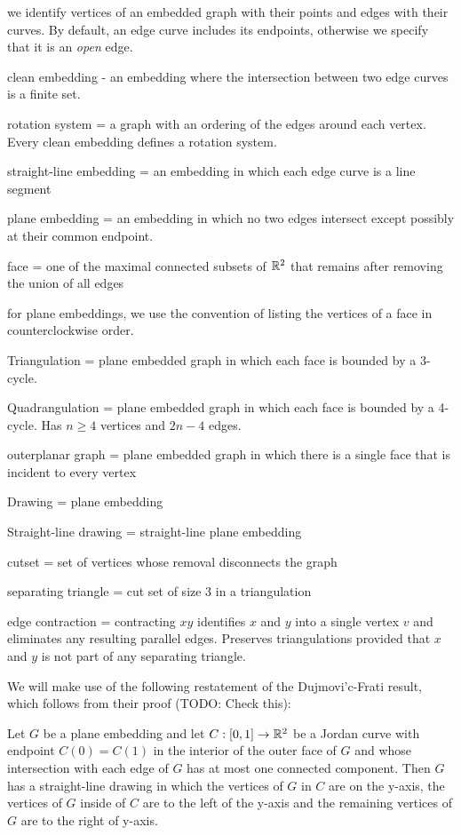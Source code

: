 \documentclass{patmorin}
\begin{document}
we identify vertices of an embedded graph with their points and edges with their curves. By default, an edge curve includes its endpoints, otherwise we specify that it is an \emph{open} edge.

clean embedding - an embedding where the intersection between two edge curves is a finite set.  

rotation system = a graph with an ordering of the edges around each vertex. Every clean embedding defines a rotation system.

straight-line embedding = an embedding in which each edge curve is a line segment

plane embedding = an embedding in which no two edges intersect except possibly at their common endpoint.

face = one of the maximal connected subsets of $\mathbb{R}^2$ that remains after removing the union of all edges

for plane embeddings, we use the convention of listing the vertices of a face in counterclockwise order.

Triangulation = plane embedded graph in which each face is bounded by a 3-cycle.

Quadrangulation = plane embedded graph in which each face is bounded by a 4-cycle. Has $n\ge 4$ vertices and $2n-4$ edges.

outerplanar graph = plane embedded graph in which there is a single face that is incident to every vertex

Drawing = plane embedding 

Straight-line drawing = straight-line plane embedding

cutset = set of vertices whose removal disconnects the graph

separating triangle = cut set of size 3 in a triangulation

edge contraction = contracting $xy$ identifies $x$ and $y$ into a single vertex $v$ and eliminates any resulting parallel edges.  Preserves triangulations provided that $x$ and $y$ is not part of any separating triangle.

We will make use of the following restatement of the Dujmovi'c-Frati
result, which follows from their proof (TODO: Check this):
\begin{thm}
   Let $G$ be a plane embedding and let $C:[0,1]\to\mathbb{R}^2$ be a Jordan
   curve with endpoint $C(0)=C(1)$ in the interior of the outer face
   of $G$ and whose intersection with each edge of $G$ has at most one
   connected component.  Then $G$ has a straight-line drawing in which
   the vertices of $G$ in $C$ are on the y-axis, the vertices of $G$
   inside of $C$ are to the left of the y-axis and the remaining vertices
   of $G$ are to the right of y-axis.
\end{thm}
\end{document}
